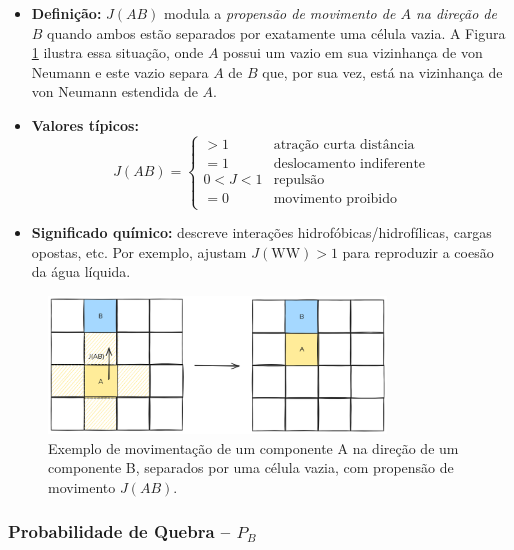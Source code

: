 \documentclass[12pt,oneside]{report}
\begin{document}
\begin{itemize}
    \item \textbf{Definição:} $J(AB)$ modula a
          \emph{propensão de movimento de $A$ na direção de $B$}
          quando ambos estão separados por exatamente uma célula vazia. A Figura \ref{fig:movimentacao_juncao} ilustra essa situação, onde $A$ possui um vazio em sua vizinhança de von Neumann e este vazio separa $A$ de $B$ que, por sua vez, está na vizinhança de von Neumann estendida de $A$.
    \item \textbf{Valores típicos:}
          \[
              J(AB)=
              \begin{cases}
                  >1    & \text{atração curta distância}  \\[2pt]
                  =1    & \text{deslocamento indiferente} \\[2pt]
                  0<J<1 & \text{repulsão}                 \\[2pt]
                  =0    & \text{movimento proibido}
              \end{cases}
          \]
    \item \textbf{Significado químico:} descreve interações
          hidrofóbicas/hidrofílicas, cargas opostas, etc.
          Por exemplo, \citeauthor{kier2005} ajustam
          $J(\mathrm{WW})>1$ para reproduzir a coesão da água líquida.
\end{itemize}

\begin{figure}[H]
    \centering
    \includegraphics[width=0.8\textwidth]{Jab.png}
    \caption{\small Exemplo de movimentação de um componente A na direção de um componente B, separados por uma célula vazia, com propensão de movimento $J(AB)$.}
    \label{fig:movimentacao_juncao}
\end{figure}

\subsubsection{Probabilidade de Quebra – \texorpdfstring{$P_B$}{Pb}}
\label{subsubsec:Pb}
\end{document}
